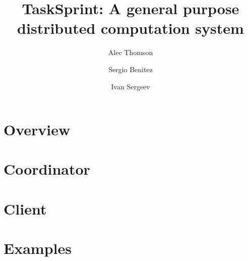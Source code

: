 \documentclass [11pt, twocolumn] {article}
\begin{document}
 

\title { TaskSprint: A general purpose distributed computation system }
\author{ Alec Thomson \and Sergio Benitez \and Ivan Sergeev }
\date {}

\maketitle


\section {Overview} 

\section {Coordinator} 

\section {Client} 

\section {Examples}
\end{document}
